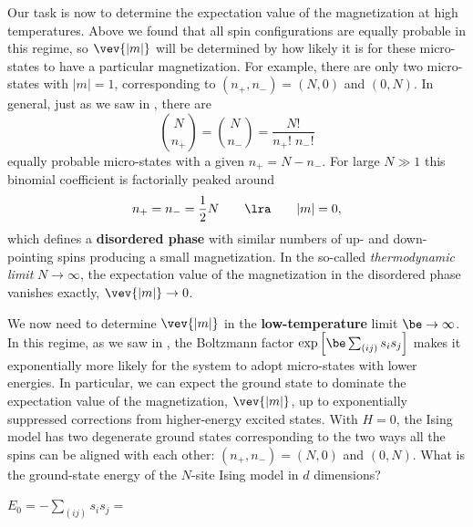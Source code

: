 Our task is now to determine the expectation value of the magnetization at high temperatures.
Above we found that all spin configurations are equally probable in this regime, so $\vev{|m|}$ will be determined by how likely it is for these micro-states to have a particular magnetization.
For example, there are only two micro-states with $|m| = 1$, corresponding to $(n_+, n_-) = (N, 0)$ and $(0, N)$.
In general, just as we saw in , there are
\begin{equation*}
  \binom{N}{n_+} = \binom{N}{n_-} = \frac{N!}{n_+! \; n_-!}
\end{equation*}
equally probable micro-states with a given $n_+ = N - n_-$.
For large $N \gg 1$ this binomial coefficient is factorially peaked around
\begin{equation*}
  n_+ = n_- = \frac{1}{2} N \qquad \lra \qquad |m| = 0,
\end{equation*}
which defines a \textbf{disordered phase} with similar numbers of up- and down-pointing spins producing a small magnetization.
In the so-called \textit{thermodynamic limit} $N \to \infty$, the expectation value of the magnetization in the disordered phase vanishes exactly, $\vev{|m|} \to 0$.

We now need to determine $\vev{|m|}$ in the \textbf{low-temperature} limit $\be \to \infty$.
In this regime, as we saw in , the Boltzmann factor $\exp\left[\be\sum_{(ij)} s_i s_j\right]$ makes it exponentially more likely for the system to adopt micro-states with lower energies.
In particular, we can expect the ground state to dominate the expectation value of the magnetization, $\vev{|m|}$, up to exponentially suppressed corrections from higher-energy excited states.
With $H = 0$, the Ising model has two degenerate ground states corresponding to the two ways all the spins can be aligned with each other: $(n_+, n_-) = (N, 0)$ and $(0, N)$.
What is the ground-state energy of the $N$-site Ising model in $d$ dimensions?
\begin{mdframed}
  $\displaystyle E_0 = -\sum_{(ij)} s_i s_j = $ \\[50 pt]
\end{mdframed}

